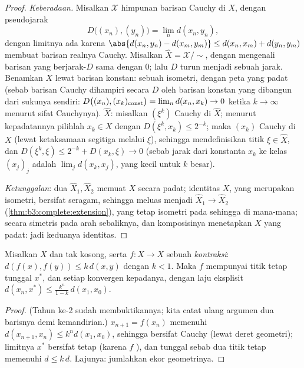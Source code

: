 \begin{proof}
\emph{Keberadaan.} Misalkan $\mathcal X$ himpunan barisan Cauchy
di $X$, dengan pseudojarak
\[
D\bigl((x_n), (y_n)\bigr) = \lim_n d(x_n, y_n),
\]
dengan limitnya ada karena $\abs{d(x_n, y_n) - d(x_m, y_m)}
\leq d(x_n, x_m) + d(y_n, y_m)$ membuat barisan realnya
Cauchy. Misalkan $\hat X = \mathcal X/{\sim}$, dengan
mengenali barisan yang berjarak-$D$ sama dengan $0$; lalu $D$ turun menjadi
sebuah jarak. Benamkan $X$ lewat barisan konstan: sebuah isometri, dengan
peta yang padat (sebab barisan Cauchy dihampiri secara $D$ oleh
barisan konstan yang dibangun dari sukunya sendiri: $D\bigl((x_n), (x_k)_{\rm
const}\bigr) = \lim_n d(x_n, x_k) \to 0$ ketika $k \to \infty$ menurut
sifat Cauchynya).  $\hat X$: misalkan $(\xi^k)$ Cauchy
di $\hat X$; menurut kepadatannya pilihlah $x_k \in X$ dengan $D(\xi^k, x_k)
\leq 2^{-k}$; maka $(x_k)$ Cauchy di $X$ (lewat ketaksamaan
segitiga melalui $\xi$), sehingga mendefinisikan titik $\xi \in \hat
X$, dan $D(\xi^k, \xi) \leq 2^{-k} + D(x_k, \xi) \to 0$ (sebab
jarak dari konstanta $x_k$ ke kelas $(x_j)_j$ adalah
$\lim_j d(x_k, x_j)$, yang kecil untuk $k$ besar).

\emph{Ketunggalan}: dua  $\hat X_1, \hat X_2$ memuat
$X$ secara padat; identitas $X$, yang merupakan isometri, bersifat 
seragam, sehingga meluas menjadi $\hat X_1 \to \hat X_2$
(\cref{thm:b3:complete:extension}), yang tetap isometri pada  sehingga di mana-mana; secara simetris pada arah sebaliknya, dan
komposisinya menetapkan $X$ yang padat: jadi keduanya identitas.
\end{proof}

\begin{theorem}\label{thm:b3:complete:banach}
Misalkan $X$  dan tak kosong, serta $f \colon X \to X$ sebuah
\emph{kontraksi}: $d(f(x), f(y)) \leq k\,d(x,y)$ dengan $k < 1$.
Maka $f$ mempunyai titik tetap tunggal $x^*$, dan setiap 
konvergen kepadanya, dengan laju eksplisit $d(x_n, x^*) \leq
\frac{k^n}{1-k}\,d(x_1, x_0)$.
\end{theorem}

\begin{proof}
(Tahun ke-2 sudah membuktikannya; kita catat ulang argumen dua barisnya demi
kemandirian.)  $x_{n+1} = f(x_n)$ memenuhi $d(x_{n+1},
x_n) \leq k^nd(x_1, x_0)$, sehingga bersifat Cauchy (lewat deret geometri);
limitnya $x^*$ bersifat tetap (karena $f$ ), dan tunggal sebab dua
titik tetap memenuhi $d \leq k\,d$. Lajunya: jumlahkan ekor
geometrinya.
\end{proof}

